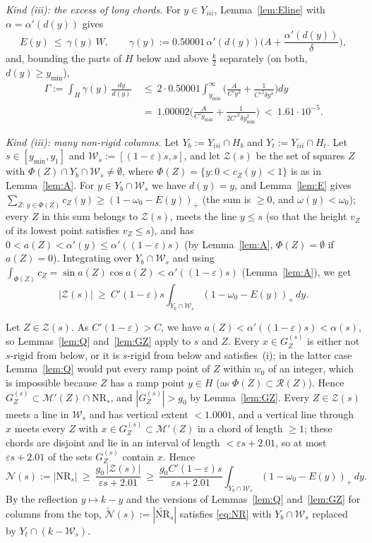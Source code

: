 \documentclass[11pt]{amsart}
\theoremstyle{definition}
\theoremstyle{remark}
\begin{document}
\smallskip\noindent\emph{Kind (iii): the excess of long chords.} For $y\in Y_{iii}$, Lemma~\ref{lem:Eline} with $\alpha=\alpha'(d(y))$ gives
\[
E(y)\ \le\ \gamma(y)\,W,\qquad \gamma(y):=0.50001\,\alpha'(d(y))\Big(A+\frac{\alpha'(d(y))}\delta\Big),
\]
and, bounding the parts of $H$ below and above $\frac k2$ separately (on both, $d(y)\ge y_{\min}$),
\begin{align*}
\Gamma:=\int_H\gamma(y)\,\frac{dy}{d(y)}\ &\le\ 2\cdot0.50001\int_{y_{\min}}^\infty\Big(\frac A{C'y^2}+\frac1{C'^2\delta y^3}\Big)dy\\
&=\ 1.00002\Big(\frac A{C'y_{\min}}+\frac1{2C'^2\delta y_{\min}^2}\Big)\ <\ 1.61\cdot10^{-5}.
\end{align*}

\smallskip\noindent\emph{Kind (iii): many non-rigid columns.}
Let $Y_b:=Y_{iii}\cap H_b$ and $Y_t:=Y_{iii}\cap H_t$. Let $s\in[y_{\min},y_1]$ and $\mathcal W_s:=[(1-\varepsilon)s,s]$, and let $\mathcal Z(s)$
be the set of squares $Z$ with $\Phi(Z)\cap Y_b\cap\mathcal W_s\ne\emptyset$, where $\Phi(Z)=\{y:0<c_Z(y)<1\}$ is as in
Lemma~\ref{lem:A}. For $y\in Y_b\cap\mathcal W_s$ we have $d(y)=y$, and Lemma~\ref{lem:E} gives
$\sum_{Z:\,y\in\Phi(Z)}c_Z(y)\ge(1-\omega_0-E(y))_+$ (the sum is $\ge0$, and $\omega(y)<\omega_0$); every $Z$ in this sum belongs to $\mathcal Z(s)$, meets the line $y\le s$ (so that the height
$v_Z$ of its lowest point satisfies $v_Z\le s$), and has $0<a(Z)<\alpha'(y)\le\alpha'((1-\varepsilon)s)$ (by Lemma~\ref{lem:A}, $\Phi(Z)=\emptyset$ if $a(Z)=0$). Integrating over $Y_b\cap\mathcal W_s$ and
using $\int_{\Phi(Z)}c_Z=\sin a(Z)\cos a(Z)<\alpha'((1-\varepsilon)s)$ (Lemma~\ref{lem:A}), we get
\[
|\mathcal Z(s)|\ \ge\ C'(1-\varepsilon)s\int_{Y_b\cap\mathcal W_s}(1-\omega_0-E(y))_+\,dy .
\]

Let $Z\in\mathcal Z(s)$. As $C'(1-\varepsilon)>C$, we have $a(Z)<\alpha'((1-\varepsilon)s)<\alpha(s)$, so Lemmas~\ref{lem:Q} and~\ref{lem:GZ}
apply to $s$ and $Z$. Every $x\in G_Z^{(s)}$ is either not $s$-rigid from below, or it is $s$-rigid from below and satisfies~(i);
in the latter case Lemma~\ref{lem:Q} would put every ramp point of $Z$ within $w_0$ of an integer, which is impossible because
$Z$ has a ramp point $y\in H$ (as $\Phi(Z)\subset\mathcal R(Z)$). Hence $G_Z^{(s)}\subset\mathcal M'(Z)\cap\mathrm{NR}_s$, and
$|G_Z^{(s)}|>g_0$ by Lemma~\ref{lem:GZ}. Every $Z\in\mathcal Z(s)$ meets a line in $\mathcal W_s$ and has vertical extent
$<1.0001$, and a vertical line through $x$ meets every $Z$ with $x\in G_Z^{(s)}\subset\mathcal M'(Z)$ in a chord of length $\ge1$; these
chords are disjoint and lie in an interval of length $<\varepsilon s+2.01$, so at most $\varepsilon s+2.01$ of the sets $G_Z^{(s)}$ contain
$x$. Hence
\begin{equation}\label{eq:NR}
\mathcal N(s):=|\mathrm{NR}_s|\ \ge\ \frac{g_0\,|\mathcal Z(s)|}{\varepsilon s+2.01}\ \ge\ \frac{g_0C'(1-\varepsilon)s}{\varepsilon s+2.01}
\int_{Y_b\cap\mathcal W_s}(1-\omega_0-E(y))_+\,dy .
\end{equation}
By the reflection $y\mapsto k-y$ and the versions of Lemmas~\ref{lem:Q} and~\ref{lem:GZ} for columns from the top,
$\widetilde{\mathcal N}(s):=|\widetilde{\mathrm{NR}}_s|$ satisfies \eqref{eq:NR} with $Y_b\cap\mathcal W_s$ replaced by $Y_t\cap(k-\mathcal W_s)$.
\end{document}
